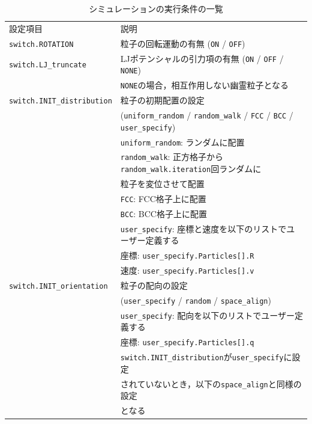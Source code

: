 \documentclass[pdflatex,a4paper,10pt,ja=standard]{bxjsarticle}
\begin{document}
\begin{longtable}{ll}
    \caption{シミュレーションの実行条件の一覧} \label{tab:simulation_settings}\\
    \toprule
    設定項目 & 説明 \\
    \cmidrule(r){1-1}
    \cmidrule(r){2-2}
    \verb|switch.ROTATION| & 粒子の回転運動の有無 (\verb|ON| / \verb|OFF|)\\
    \verb|switch.LJ_truncate| & LJポテンシャルの引力項の有無 (\verb|ON| / \verb|OFF| / \verb|NONE|)\\
    & \verb|NONE|の場合，相互作用しない幽霊粒子となる \\
    \verb|switch.INIT_distribution| & 粒子の初期配置の設定 \\
    & (\verb|uniform_random| / \verb|random_walk| / \verb|FCC| / \verb|BCC| / \verb|user_specify|)\\
    & \verb|uniform_random|: ランダムに配置 \\
    & \verb|random_walk|: 正方格子から\verb|random_walk.iteration|回ランダムに\\
    & \hspace{14.5ex} 粒子を変位させて配置\\
    & \verb|FCC|: FCC格子上に配置 \\
    & \verb|BCC|: BCC格子上に配置 \\
    & \verb|user_specify|: 座標と速度を以下のリストでユーザー定義する\\
    & \hspace{15.5ex} 座標: \verb|user_specify.Particles[].R| \\
    & \hspace{15.5ex} 速度: \verb|user_specify.Particles[].v| \\
    \verb|switch.INIT_orientation| & 粒子の配向の設定 \\
    &(\verb|user_specify| / \verb|random| / \verb|space_align|) \\
    & \verb|user_specify|: 配向を以下のリストでユーザー定義する\\
    & \hspace{15.5ex} 座標: \verb|user_specify.Particles[].q| \\
    & \hspace{15.5ex} \verb|switch.INIT_distribution|が\verb|user_specify|に設定\\
    & \hspace{15.5ex} されていないとき，以下の\verb|space_align|と同様の設定\\
    & \hspace{15.5ex} となる\\

\end{longtable}
\end{document}
